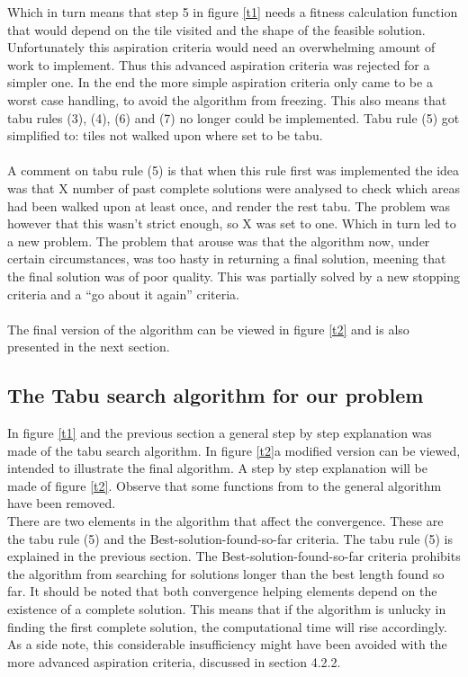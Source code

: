 Which in turn means that step 5 in figure \ref{t1} needs a fitness calculation function that would depend on the tile visited and the shape of the feasible solution. Unfortunately this aspiration criteria would need an overwhelming amount of work to implement. Thus this advanced aspiration criteria was rejected for a simpler one. In the end the more simple aspiration criteria only came to be a worst case handling, to avoid the algorithm from freezing. This also means that tabu rules (3), (4), (6) and (7) no longer could be implemented. Tabu rule (5) got simplified to: tiles not walked upon where set to be tabu.\\
\\A comment on tabu rule (5) is that when this rule first was implemented the idea was that X number of past complete solutions were analysed to check which areas had been walked upon at least once, and render the rest tabu. The problem was however that this wasn't strict enough, so X was set to one. Which in turn led to a new problem. The problem that arouse was that the algorithm now, under certain circumstances, was too hasty in returning a final solution, meening that the final solution was of poor quality. This was partially solved by a new stopping criteria and a ``go about it again'' criteria.\\
\\The final version of the algorithm can be viewed in figure \ref{t2} and is also presented in the next section.
\subsection{The Tabu search algorithm for our problem}
In figure \ref{t1} and the previous section a general step by step explanation was made of the tabu search algorithm. In figure \ref{t2}a modified version can be viewed, intended to illustrate the final algorithm. A step by step explanation will be made of figure \ref{t2}. Observe that some functions from to the general algorithm have been removed.\\

There are two elements in the algorithm that affect the convergence. These are the tabu rule (5) and the Best-solution-found-so-far criteria. The tabu rule (5) is explained in the previous section. The Best-solution-found-so-far criteria prohibits the algorithm from searching for solutions longer than the best length found so far. It should be noted that both convergence helping elements depend on the existence of a complete solution. This means that if the algorithm is unlucky in finding the first complete solution, the computational time will rise accordingly. As a side note, this considerable insufficiency might have been avoided with the more advanced aspiration criteria, discussed in section 4.2.2.

